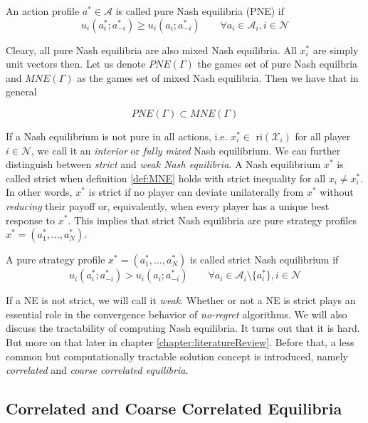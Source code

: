 \begin{definition}\label{def:PNE}
    An action profile $a^* \in \mathcal{A}$ is called pure Nash equilibria (PNE) if
    \[u_i(a_{i}^{*};a_{-i}^{*}) \ge u_i(a_{i};a_{-i}^{*}) \qquad \forall a_i \in \mathcal{A}_i, i \in \mathcal{N}\]
\end{definition}

Cleary, all pure Nash equilibria are also mixed Nash equilibria. All $x_{i}^{*}$ are simply unit vectors then. Let us denote $PNE(\Gamma)$ the games set of pure Nash equilbria and $MNE(\Gamma)$ as the games set of mixed Nash equilibria. Then we have that in general

\begin{equation*}
    PNE(\Gamma) \subset MNE(\Gamma)
\end{equation*}

If a Nash equilibrium is not pure in all actions, i.e. $x_i^* \in$ ri$(\mathcal{X}_i)$ for all player $i \in \mathcal{N}$,  we call it an \textit{interior} or \textit{fully mixed} Nash equilibrium. We can further distinguish between \textit{strict} and \textit{weak Nash equilibria}. A Nash equilibrium $x^*$ is called strict when definition \ref{def:MNE} holds with strict inequality for all $x_i \neq x_{i}^{*}$. In other words, $x^*$ is strict if no player can deviate unilaterally from $x^*$ without \textit{reducing} their payoff or, equivalently, when every player has a unique best response to $x^*$. This implies that strict Nash equilibria are pure strategy profiles $x^* = (a_{1}^{*},\dots,a_{N}^{*})$.

\begin{definition}\label{def:strictNE}
    A pure strategy profile $x^* = (a_{1}^{*},\dots,a_{N}^{*})$ is called strict Nash equilibrium if
    \[u_i(a_{i}^{*};a_{-i}^{*}) > u_i(a_{i};a_{-i}^{*}) \qquad \forall a_i \in \mathcal{A}_i \setminus \{a_{i}^{*}\} , i \in \mathcal{N}\]
\end{definition}

If a NE is not strict, we will call it \textit{weak}. Whether or not a NE is strict plays an essential role in the convergence behavior of \textit{no-regret} algorithms. We will also discuss the tractability of computing Nash equilibria. It turns out that it is hard. But more on that later in chapter \ref{chapter:literatureReview}. Before that, a less common but computationally tractable solution concept is introduced, namely \textit{correlated} and \textit{coarse correlated equilibria}.

\subsection{Correlated and Coarse Correlated Equilibria}\label{subsection:CEandCCE}

